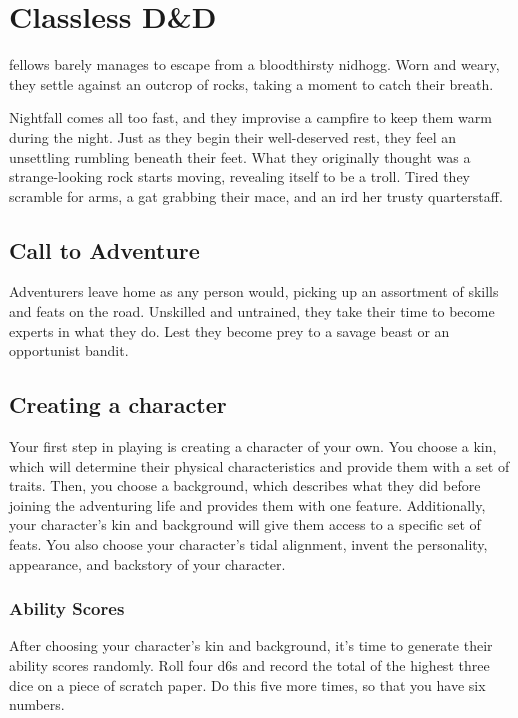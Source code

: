 \section*{Classless D\&D} \label{sec::classlessdnd}
fellows barely manages to escape from a bloodthirsty nidhogg.
Worn and weary, they settle against an outcrop of rocks, taking a moment to catch their breath.

Nightfall comes all too fast, and they improvise a campfire to keep them warm during the night.
Just as they begin their well-deserved rest, they feel an unsettling rumbling beneath their feet.
What they originally thought was a strange-looking rock starts moving, revealing itself to be a troll.
Tired they scramble for arms, a gat grabbing their mace, and an ird her trusty quarterstaff.

\subsection*{Call to Adventure}
    Adventurers leave home as any person would, picking up an assortment of skills and feats on the road.
    Unskilled and untrained, they take their time to become experts in what they do.
    Lest they become prey to a savage beast or an opportunist bandit.

\subsection*{Creating a character}
    Your first step in playing is creating a character of your own.
    You choose a kin, which will determine their physical characteristics and provide them with a set of traits.
    Then, you choose a background, which describes what they did before joining the adventuring life and provides them with one feature.
    Additionally, your character's kin and background will give them access to a specific set of feats.
    You also choose your character's tidal alignment, invent the personality, appearance, and backstory of your character.

    \subsubsection{Ability Scores}
        After choosing your character's kin and background, it's time to generate their ability scores randomly.
        Roll four d6s and record the total of the highest three dice on a piece of scratch paper.
        Do this five more times, so that you have six numbers.

